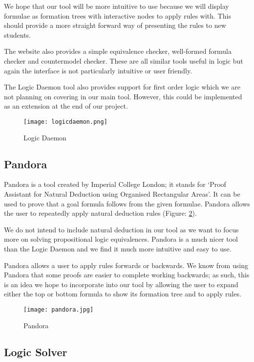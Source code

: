 \documentclass{report}
\begin{document}
We hope that our tool will be more intuitive to use because we will display formulae as formation trees with interactive nodes to apply rules with. This should provide a more straight forward way of presenting the rules to new students.

The website also provides a simple equivalence checker, well-formed formula checker and countermodel checker. These are all similar tools useful in logic but again the interface is not particularly intuitive or user friendly.

The Logic Daemon tool also provides support for first order logic which we are not planning on covering in our main tool. However, this could be implemented as an extension at the end of our project.

\begin{figure}[ht]
    \centering
    \texttt{[image: logicdaemon.png]}
    \caption{Logic Daemon}
    \label{logicdaemon}
\end{figure}

\subsection{Pandora}

Pandora\cite{pandora} is a tool created by Imperial College London; it stands for `Proof Assistant for Natural Deduction using Organised Rectangular Areas'. It can be used to prove that a goal formula follows from the given formulae. Pandora allows the user to repeatedly apply natural deduction rules (Figure: \ref{pandora}).

We do not intend to include natural deduction in our tool as we want to focus more on solving propositional logic equivalences. Pandora is a much nicer tool than the Logic Daemon and we find it much more intuitive and easy to use.

Pandora allows a user to apply rules forwards or backwards. We know from using Pandora that some proofs are easier to complete working backwards; as such, this is an idea we hope to incorporate into our tool by allowing the user to expand either the top or bottom formula to show its formation tree and to apply rules. 

\begin{figure}[ht]
    \centering
    \texttt{[image: pandora.jpg]}
    \caption{Pandora}
    \label{pandora}
\end{figure}

\subsection{Logic Solver}
\end{document}
